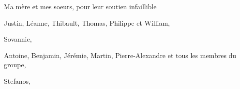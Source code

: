 \begin{comment}
\end{comment}

Ma mère et mes soeurs, pour leur soutien infaillible

Justin, Léanne, Thibault, Thomas, Philippe et William,

Sovannie,

Antoine, Benjamin, Jérémie, Martin, Pierre-Alexandre et tous les membres du groupe,

Stefanos,


